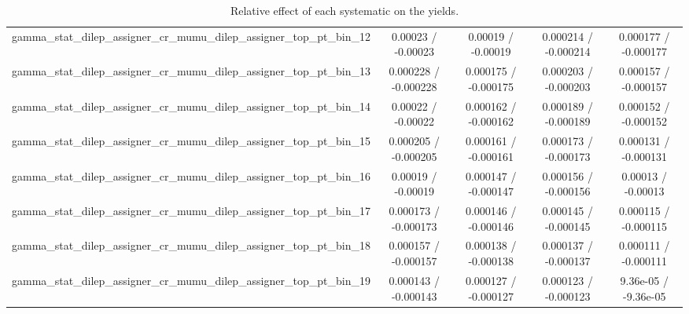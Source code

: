 \documentclass[10pt]{article}
\begin{document}
\begin{table}[htbp]
\begin{center}
\begin{tabular}{|c|c|c|c|c|}
  gamma_stat_dilep_assigner_cr_mumu_dilep_assigner_top_pt_bin_12 & 0.00023 / -0.00023 & 0.00019 / -0.00019 & 0.000214 / -0.000214 & 0.000177 / -0.000177 \\ 
  gamma_stat_dilep_assigner_cr_mumu_dilep_assigner_top_pt_bin_13 & 0.000228 / -0.000228 & 0.000175 / -0.000175 & 0.000203 / -0.000203 & 0.000157 / -0.000157 \\ 
  gamma_stat_dilep_assigner_cr_mumu_dilep_assigner_top_pt_bin_14 & 0.00022 / -0.00022 & 0.000162 / -0.000162 & 0.000189 / -0.000189 & 0.000152 / -0.000152 \\ 
  gamma_stat_dilep_assigner_cr_mumu_dilep_assigner_top_pt_bin_15 & 0.000205 / -0.000205 & 0.000161 / -0.000161 & 0.000173 / -0.000173 & 0.000131 / -0.000131 \\ 
  gamma_stat_dilep_assigner_cr_mumu_dilep_assigner_top_pt_bin_16 & 0.00019 / -0.00019 & 0.000147 / -0.000147 & 0.000156 / -0.000156 & 0.00013 / -0.00013 \\ 
  gamma_stat_dilep_assigner_cr_mumu_dilep_assigner_top_pt_bin_17 & 0.000173 / -0.000173 & 0.000146 / -0.000146 & 0.000145 / -0.000145 & 0.000115 / -0.000115 \\ 
  gamma_stat_dilep_assigner_cr_mumu_dilep_assigner_top_pt_bin_18 & 0.000157 / -0.000157 & 0.000138 / -0.000138 & 0.000137 / -0.000137 & 0.000111 / -0.000111 \\ 
  gamma_stat_dilep_assigner_cr_mumu_dilep_assigner_top_pt_bin_19 & 0.000143 / -0.000143 & 0.000127 / -0.000127 & 0.000123 / -0.000123 & 9.36e-05 / -9.36e-05 \\ 
\hline 
\end{tabular} 
\caption{Relative effect of each systematic on the yields.} 
\end{center} 
\end{table} 
\end{document}
